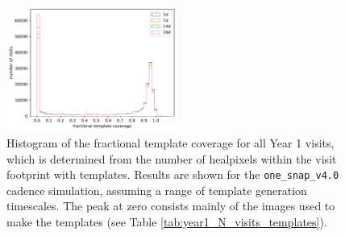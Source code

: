 \documentclass[preprintm,linenumbers]{aastex631}
\newcommand{\baseline}{\texttt{one\_snap\_v4.0}\xspace}
\begin{document}
  		
		\begin{figure}
			\centering
			\includegraphics[width=0.5\textwidth]{results/fractional_template_coverage_first_year_one_snap_v4_0_10yrs_db_noDD_noTwi.pdf}
			\caption{Histogram of the fractional template coverage for all Year 1 visits, which is determined from the number of healpixels within the visit footprint with templates.
				Results are shown for the \baseline cadence simulation, assuming a range of template generation timescales.
				The peak at zero consists mainly of the images used to make the templates (see Table \ref{tab:year1_N_visits_templates}).
			}
			\label{fig:fractional_template_coverage}
		\end{figure}
\end{document}
